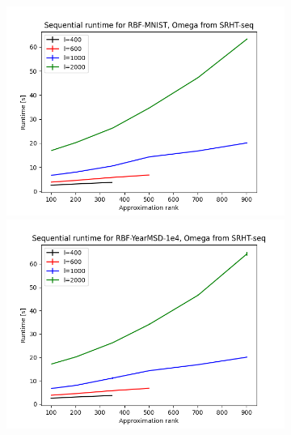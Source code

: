 \documentclass{article}
\theoremstyle{definition}
\begin{document}
\begin{figure}
\centering
\hfill\begin{subfigure}[t]{\textwidth+20pt\relax}
    \includegraphics[width=\dimexpr\linewidth-20pt\relax]{plots/runtime_new/runtime_RBF-MNIST_SRHT-seq.png}
    \includegraphics[width=\dimexpr\linewidth-20pt\relax]{plots/runtime_new/runtime_RBF-YearMSD-1e4_SRHT-seq.png}

\end{subfigure}
\end{figure}
\end{document}
